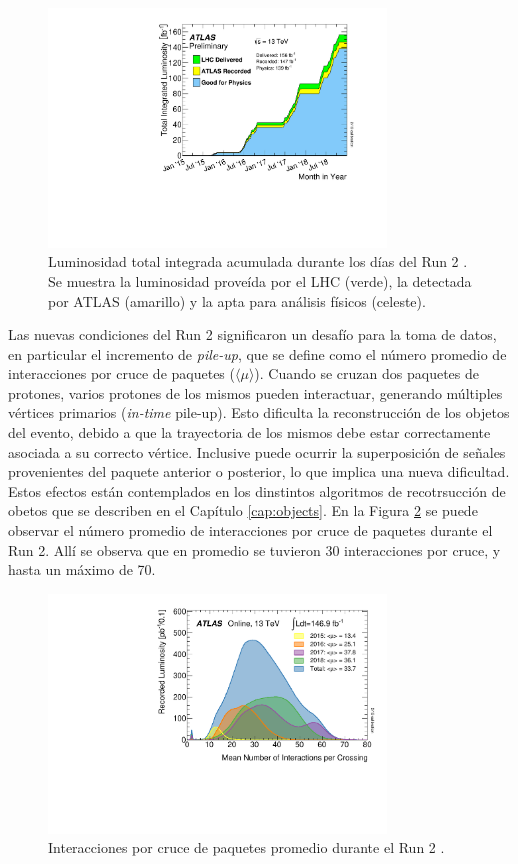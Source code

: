 \begin{figure}
  \centering
  \includegraphics[width=0.8\textwidth]{images/lhc/intlumivstimeRun2DQall.pdf}
  \caption{Luminosidad total integrada acumulada durante los días del Run 2 \cite{lumi_plot}. Se muestra la luminosidad proveída por el LHC (verde), la detectada por ATLAS (amarillo) y la apta para análisis físicos (celeste).}
  \label{fig:run2_lumi}
\end{figure}

Las nuevas condiciones del Run 2 significaron un desafío para la toma de datos, en particular el incremento de \textit{pile-up}, que se define como el número promedio de interacciones por cruce de paquetes ($\langle \mu \rangle$). Cuando se cruzan dos paquetes de protones, varios protones de los mismos pueden interactuar, generando múltiples vértices primarios (\textit{in-time} pile-up). Esto dificulta la reconstrucción de los objetos del evento, debido a que la trayectoria de los mismos debe estar correctamente asociada a su correcto vértice. Inclusive puede ocurrir la superposición de señales provenientes del paquete anterior o posterior, lo que implica una nueva dificultad. Estos efectos están contemplados en los dinstintos algoritmos de recotrsucción de obetos que se describen en el Capítulo \ref{cap:objects}. En la Figura \ref{fig:pileup} se puede observar el número promedio de interacciones por cruce de paquetes durante el Run 2. Allí se observa que en promedio se tuvieron 30 interacciones por cruce, y hasta un máximo de 70. 

\begin{figure}
  \centering
  \includegraphics[width=0.8\textwidth]{images/lhc/mu_2015_2018.pdf}
  \caption{Interacciones por cruce de paquetes promedio durante el Run 2 \cite{lumi_plot}.}
  \label{fig:pileup}
\end{figure}

